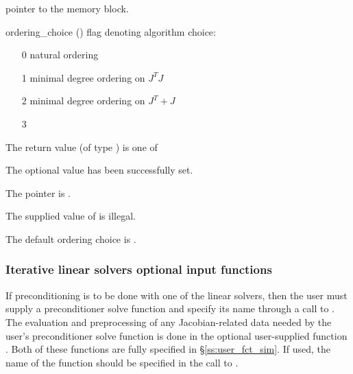 {{\begin{args}
    pointer to the {\ida} memory block.
  \item[ordering\_choice] ()
    flag denoting algorithm choice:
    \begin{itemize}
    \item[0] natural ordering
    \item[1] minimal degree ordering on $J^TJ$
    \item[2] minimal degree ordering on $J^T + J$
    \item[3] 
    \end{itemize}
  \end{args}
}
{
  The return value  (of type ) is one of
  \begin{args}
  \item[\Id{IDASLS\_SUCCESS}] 
    The optional value has been successfully set.
  \item[\Id{IDASLS\_MEM\_NULL}]
    The  pointer is .
  \item[\Id{IDASLS\_ILL\_INPUT}]
    The supplied value of  is illegal.
  \end{args}
}
{
  The default ordering choice is .
}
\subsubsection{Iterative linear solvers optional input functions}\label{sss:optin_spils}
If preconditioning is to be done with one of the {\idaspils} linear solvers, 
then the user must supply a preconditioner solve function  and specify
its name through a call to .
The evaluation and preprocessing of any Jacobian-related data needed
by the user's preconditioner solve function is done in the optional
user-supplied function . Both of these functions are
fully specified in \S\ref{ss:user_fct_sim}.
If used, the name of the  function should be specified in the call to
.

}
